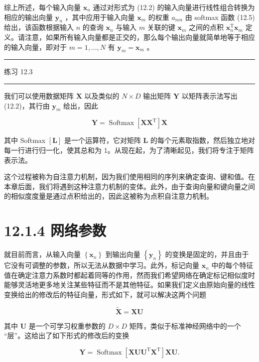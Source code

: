 \documentclass[10pt]{article}
\newcommand{\HRule}{\begin{center}\rule{0.9\linewidth}{0.2mm}\end{center}}
\begin{document}
综上所述，每个输入向量 \({\mathbf{x}}_{n}\) 通过对形式为 (12.2) 的输入向量进行线性组合转换为相应的输出向量 \({\mathbf{y}}_{n}\) ，其中应用于输入向量 \({\mathbf{x}}_{m}\) 的权重 \({a}_{nm}\) 由 softmax 函数 (12.5) 给出，该函数根据输入 \(n\) 的查询 \({\mathbf{x}}_{n}\) 与输入 \(m\) 关联的键 \({\mathbf{x}}_{m}\) 之间的点积 \({\mathbf{x}}_{n}^{\mathrm{T}}{\mathbf{x}}_{m}\) 定义。请注意，如果所有输入向量都是正交的，那么每个输出向量就简单地等于相应的输入向量，即对于 \(m = 1,\ldots ,N\) 有 \({\mathbf{y}}_{m} = {\mathbf{x}}_{m}\) 。

\HRule

练习 12.3

\HRule

我们可以使用数据矩阵 \(\mathbf{X}\) 以及类似的 \(N \times  D\) 输出矩阵 \(\mathbf{Y}\) 以矩阵表示法写出 (12.2)，其行由 \({\mathbf{y}}_{m}\) 给出，因此

\[
\mathbf{Y} = \operatorname{Softmax}\left\lbrack  {\mathbf{X}{\mathbf{X}}^{\mathrm{T}}}\right\rbrack  \mathbf{X} \tag{12.6}
\]

其中 Softmax \(\left\lbrack  \mathbf{L}\right\rbrack\) 是一个运算符，它对矩阵 \(\mathbf{L}\) 的每个元素取指数，然后独立地对每一行进行归一化，使其总和为 1。从现在起，为了清晰起见，我们将专注于矩阵表示法。

这个过程被称为自注意力机制，因为我们使用相同的序列来确定查询、键和值。在本章后面，我们将遇到这种注意力机制的变体。此外，由于查询向量和键向量之间的相似度度量是通过点积给出的，因此这被称为点积自注意力机制。

\section*{12.1.4 网络参数}

就目前而言，从输入向量 \(\left\{  {\mathbf{x}}_{n}\right\}\) 到输出向量 \(\left\{  {\mathbf{y}}_{n}\right\}\) 的变换是固定的，并且由于它没有可调整的参数，所以无法从数据中学习。此外，标记向量 \({\mathbf{x}}_{n}\) 中的每个特征值在确定注意力系数时都起着同等的作用，然而我们希望网络在确定标记相似度时能够灵活地更多地关注某些特征而不是其他特征。如果我们定义由原始向量的线性变换给出的修改后的特征向量，形式如下，就可以解决这两个问题

\[
\widetilde{\mathbf{X}} = \mathbf{{XU}} \tag{12.7}
\]

其中 \(\mathbf{U}\) 是一个可学习权重参数的 \(D \times  D\) 矩阵，类似于标准神经网络中的一个 “层”。这给出了如下形式的修改后的变换

\[
\mathbf{Y} = \operatorname{Softmax}\left\lbrack  {{\mathbf{{XUU}}}^{\mathrm{T}}{\mathbf{X}}^{\mathrm{T}}}\right\rbrack  \mathbf{{XU}}. \tag{12.8}
\]
\end{document}
